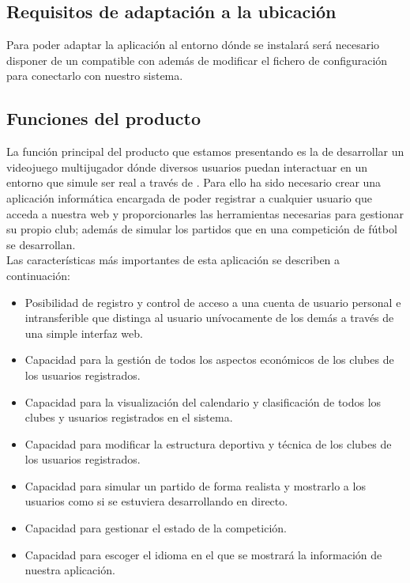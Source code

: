 \subsection{Requisitos de adaptación a la ubicación}
Para poder adaptar la aplicación al entorno dónde se instalará será necesario
disponer de un  compatible con  además de modificar
el fichero de configuración para conectarlo con nuestro sistema.

\subsection{Funciones del producto}
La función principal del producto que estamos presentando es la de desarrollar
un videojuego multijugador dónde diversos usuarios puedan interactuar en un
entorno que simule ser real a través de .  Para ello ha sido
necesario crear una aplicación informática encargada de poder registrar a
cualquier usuario que acceda a nuestra web y proporcionarles las herramientas
necesarias para gestionar su propio club; además de simular los partidos que en
una competición de fútbol
se desarrollan.\\

Las características más importantes de esta aplicación se describen a
continuación:

\begin{itemize}
\item Posibilidad de registro y control de acceso a una cuenta de usuario
  personal e intransferible que distinga al usuario unívocamente de los demás a
  través de una simple interfaz web.
\item Capacidad para la gestión de todos los aspectos económicos de los clubes
  de los usuarios registrados.
\item Capacidad para la visualización del calendario y clasificación de todos
  los clubes y usuarios registrados en el sistema.
\item Capacidad para modificar la estructura deportiva y técnica de los clubes
  de los usuarios registrados.
\item Capacidad para simular un partido de forma realista y mostrarlo a los
  usuarios como si se estuviera desarrollando en directo.
\item Capacidad para gestionar el estado de la competición.
\item Capacidad para escoger el idioma en el que se mostrará la información de
  nuestra aplicación.
\end{itemize}

